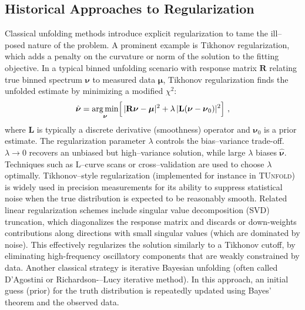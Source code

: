     \subsection{Historical Approaches to Regularization}
        Classical unfolding methods introduce explicit regularization to tame the ill--posed nature of the problem.
        A prominent example is {Tikhonov regularization}, which adds a penalty on the curvature or norm of the solution to the fitting objective.\kd{}
        In a typical binned unfolding scenario with response matrix $\mathbf{R}$ relating true binned spectrum $\boldsymbol{\nu}$ to measured data $\boldsymbol{\mu}$, Tikhonov regularization finds the unfolded estimate by minimizing a modified $\chi^2$:
        \begin{equation}
            \hat{\boldsymbol{\nu}} = \underset{\vb*\nu}{\arg\min} \Big[\,|\mathbf{R}\boldsymbol{\nu} - \boldsymbol{\mu}|^2 + \lambda\,| \mathbf{L}(\boldsymbol{\nu}-\boldsymbol{\nu}_0)|^2 \Big]~,
        \end{equation}
        where $\mathbf{L}$ is typically a discrete derivative (smoothness) operator and $\boldsymbol{\nu}_0$ is a prior estimate.\kd{}
        The regularization parameter $\lambda$ controls the bias–variance trade-off\kd{}.
        $\lambda\to 0$ recovers an unbiased but high--variance solution, while large $\lambda$ biases $\hat{\boldsymbol{\nu}}$.
        Techniques such as L--curve scans or cross--validation are used to choose $\lambda$ optimally.\kd{}
        Tikhonov--style regularization (implemented for instance in \textsc{TUnfold}\kd{}) is widely used in precision measurements for its ability to suppress statistical noise when the true distribution is expected to be reasonably smooth.
        Related linear regularization schemes include {singular value decomposition (SVD) truncation}, which diagonalizes the response matrix and discards or down-weights contributions along directions with small singular values (which are dominated by noise).
        This effectively regularizes the solution similarly to a Tikhonov cutoff, by eliminating high-frequency oscillatory components that are weakly constrained by data. 
        Another classical strategy is {iterative Bayesian unfolding} (often called D’Agostini or Richardson-–Lucy iterative method).
        In this approach, an initial guess (prior) for the truth distribution is repeatedly updated using Bayes’ theorem and the observed data.
